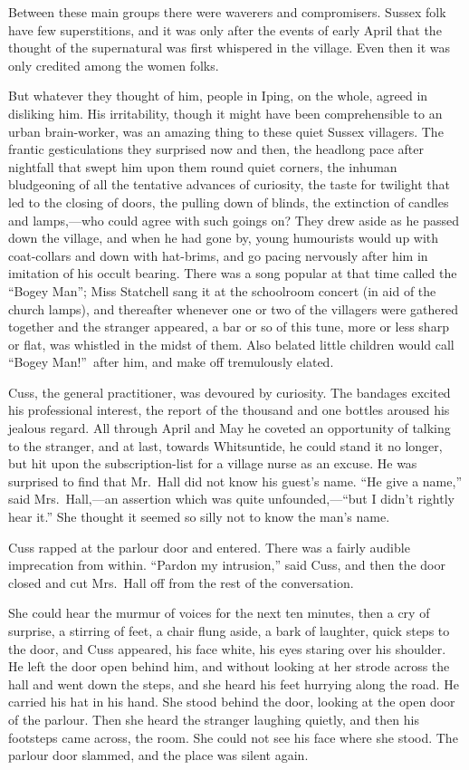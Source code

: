 Between these main groups there were waverers and compromisers. Sussex folk have few superstitions, and it was only after the events of early April that the thought of the supernatural was first whispered in the village. Even then it was only credited among the women folks.

But whatever they thought of him, people in Iping, on the whole, agreed in disliking him. His irritability, though it might have been comprehensible to an urban brain-worker, was an amazing thing to these quiet Sussex villagers. The frantic gesticulations they surprised now and then, the headlong pace after nightfall that swept him upon them round quiet corners, the inhuman bludgeoning of all the tentative advances of curiosity, the taste for twilight that led to the closing of doors, the pulling down of blinds, the extinction of candles and lamps,—who could agree with such goings on? They drew aside as he passed down the village, and when he had gone by, young humourists would up with coat-collars and down with hat-brims, and go pacing nervously after him in imitation of his occult bearing. There was a song popular at that time called the “Bogey Man”; Miss Statchell sang it at the schoolroom concert (in aid of the church lamps), and thereafter whenever one or two of the villagers were gathered together and the stranger appeared, a bar or so of this tune, more or less sharp or flat, was whistled in the midst of them. Also belated little children would call “Bogey Man!”\ after him, and make off tremulously elated.

Cuss, the general practitioner, was devoured by curiosity. The bandages excited his professional interest, the report of the thousand and one bottles aroused his jealous regard. All through April and May he coveted an opportunity of talking to the stranger, and at last, towards Whitsuntide, he could stand it no longer, but hit upon the subscription-list for a village nurse as an excuse. He was surprised to find that Mr.\ Hall did not know his guest’s name. “He give a name,” said Mrs.\ Hall,—an assertion which was quite unfounded,—“but I didn’t rightly hear it.” She thought it seemed so silly not to know the man’s name.

Cuss rapped at the parlour door and entered. There was a fairly audible imprecation from within. “Pardon my intrusion,” said Cuss, and then the door closed and cut Mrs.\ Hall off from the rest of the conversation.

She could hear the murmur of voices for the next ten minutes, then a cry of surprise, a stirring of feet, a chair flung aside, a bark of laughter, quick steps to the door, and Cuss appeared, his face white, his eyes staring over his shoulder. He left the door open behind him, and without looking at her strode across the hall and went down the steps, and she heard his feet hurrying along the road. He carried his hat in his hand. She stood behind the door, looking at the open door of the parlour. Then she heard the stranger laughing quietly, and then his footsteps came across, the room. She could not see his face where she stood. The parlour door slammed, and the place was silent again.

